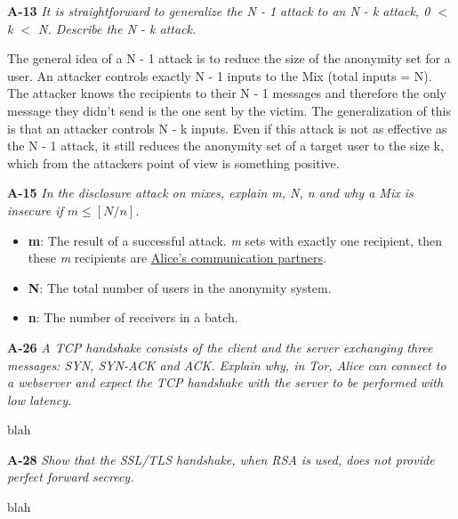 \documentclass[a4paper]{article}
\newcommand{\Q}[2]{ \vspace{10pt} \textbf{#1} \textit{#2} }
\newcommand{\A}[1]{ #1 }
\begin{document}
\Q{A-13} { %
  It is straightforward to generalize the N - 1 attack to an 
  N - k attack, 0 $<$ k $<$ N. Describe the N - k attack.
}

\A{
  The general idea of a N - 1 attack is to reduce the size of
  the anonymity set for a user. An attacker controls exactly N - 1 
  inputs to the Mix (total inputs = N). The attacker knows
  the recipients to their N - 1 messages and therefore the only 
  message they didn't send is the one sent by the victim.
  The generalization of this is that an attacker controls N - k
  inputs. Even if this attack is not as effective as the N - 1
  attack, it still reduces the anonymity set of a target user 
  to the size k, which from the attackers point of view
  is something positive.  
}

\Q{A-15} {
  In the disclosure attack on mixes, 
  explain m, N, n and why a Mix is insecure if $m \leq [N / n]$.
}

\A{
  \begin{itemize}
    \item \textbf{m}: The result of a successful attack. 
    \textit{m} sets with exactly one recipient, then these \textit{m}
    recipients are \underline{Alice's communication partners}. 
    \item \textbf{N}: The total number of users in the anonymity system.
    \item \textbf{n}: The number of receivers in a batch.
  \end{itemize}
}

\Q{A-26} {
  A TCP handshake consists of the client and the server exchanging 
  three messages: SYN, SYN-ACK and ACK. 
  Explain why, in Tor, Alice can connect to a webserver and expect 
  the TCP handshake with the
  server to be performed with low latency.
}

\A{
  blah
}

\Q{A-28} {
  Show that the SSL/TLS handshake, when RSA is used, 
  does not provide perfect forward secrecy.
}

\A{
  blah
}


\end{document}
